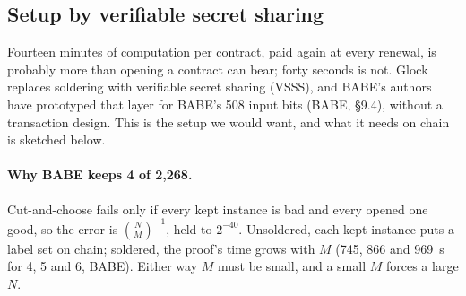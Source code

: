 \documentclass[11pt]{article}
\begin{document}
\subsection{Setup by verifiable secret sharing}
\label{sec:vsss}

Fourteen minutes of computation per contract, paid again at every
renewal, is probably more than opening a contract can bear; forty
seconds is not. Glock~\cite{glock} replaces soldering with verifiable
secret sharing (VSSS), and BABE's authors have prototyped that layer for
BABE's 508 input bits (BABE, §9.4), without a transaction design. This
is the setup we would want, and what it needs on chain is sketched
below.

\paragraph{Why BABE keeps 4 of 2,268.} Cut-and-choose fails only if
every kept instance is bad and every opened one good, so the error is
$\binom{N}{M}^{-1}$, held to $2^{-40}$. Unsoldered, each kept instance
puts a label set on chain; soldered, the proof's time grows with $M$
(745, 866 and 969~s for 4, 5 and 6, BABE). Either way $M$ must be small,
and a small $M$ forces a large $N$.
\end{document}

